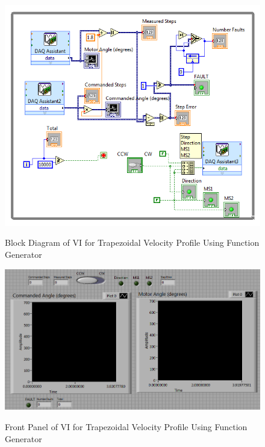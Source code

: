 \documentclass{article}
\theoremstyle{plain}
\theoremstyle{definition}
\theoremstyle{remark}
\begin{document}
\begin{figure}[h!]
\begin{center}
\includegraphics[width=16cm]{ExternalsourceBack.png}
\caption{Block Diagram of VI for Trapezoidal Velocity Profile Using Function Generator} \label{tex}
\label{fig:q4_5}
\end{center}
\end{figure}

\begin{figure}[h!]
\begin{center}
\includegraphics[width=12cm]{ExternalSourceFront.png}
\caption{Front Panel of VI for Trapezoidal Velocity Profile Using Function Generator} \label{tex}
\label{fig:q4_6}
\end{center}
\end{figure}
\end{document}

